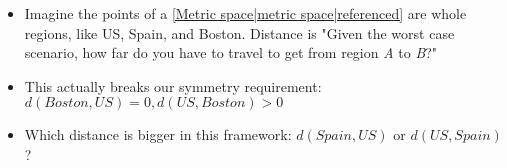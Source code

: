 
\begin{itemize}
    \item Imagine the points of a \ref{Metric space|metric space|referenced} are whole regions, like US, Spain, and Boston. Distance is "Given the worst case scenario, how far do you have to travel to get from region \emph{A} to \emph{B}?"
    \item This actually breaks our symmetry requirement: $d(Boston,US)=0, d(US,Boston) > 0$
    \item Which distance is bigger in this framework: $d(Spain,US)$ or $d(US,Spain)$?
  \end{itemize}